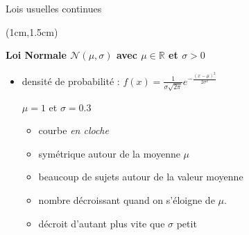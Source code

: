\documentclass{beamer}
\begin{document}

\begin{frame}{Lois usuelles continues}
\begin{textblock*}{\textwidth}(1cm,1.5cm)

\begin{center}{\bf \Large Loi Normale $\mathcal{N}(\mu,\sigma)$ avec $\mu\in \mathbb{R}$ et $\sigma>0$} \end{center}
\begin{itemize}
\item \small densité de probabilité  :
$
f(x)=\frac{1}{\sigma\sqrt{2\pi}} e^{-\frac{(x-\mu)^2}{2\sigma^2}}
$

\begin{center}
\begin{minipage}{0.3\textwidth}
\begin{center}

$\mu=1$ et $\sigma=0.3$

\end{center}
\end{minipage}
\quad
\begin{minipage}{0.55\textwidth}
\begin{itemize}
\item courbe {\it en cloche}
\item symétrique autour de la moyenne $\mu$
\item  beaucoup de sujets autour de la valeur moyenne
\item nombre décroissant quand on s'éloigne
de $\mu$.
\item décroit d'autant plus vite que $\sigma$ petit
\end{itemize}
\end{minipage}
\end{center}

\end{itemize}

 \end{textblock*}

\end{frame}
\end{document}
